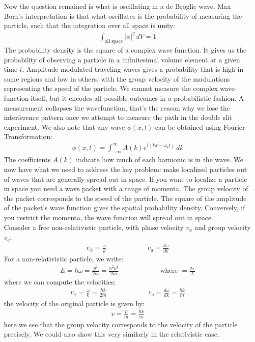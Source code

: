 \documentclass[11pt]{article}
\theoremstyle{break}
\theoremstyle{break}
\begin{document}
Now the question remained is what is oscillating in a de Broglie wave. Max Born's interpretation is that what oscillates is the probability of measuring the particle, such that the integration over all space is unity:
\begin{align*}
\int_{\text{all space}} |\phi|^2 \, dV = 1
\end{align*}
The probability density is the square of a complex wave function. It gives us the probability of observing a particle in a infinitesimal volume element at a given time $t$. Amplitude-modulated traveling waves gives a probability that is high in some regions and low in others, with the group velocity of the modulations representing the speed of the particle. We cannot measure the complex wave-function itself, but it encodes all possible outcomes in a probabilistic fashion. A measurement collapses the wavefunction, that's the reason why we lose the interference pattern once we attempt to measure the path in the double slit experiment. We also note that any wave $\phi(x,t)$ can be obtained using Fourier Transformation:
\begin{align*}
\phi(x,t) = \int_{-\infty}^\infty A(k) e^{i(kx - \omega_k t)}\, dk
\end{align*}
The coefficients $A(k)$ indicate how much of each harmonic is in the wave. We now have what we need to address the key problem: make localized particles out of waves that are generally spread out in space. If you want to localize a particle in space you need a wave packet with a range of momenta. The group velocity of the packet corresponds to the speed of the particle. The square of the amplitude of the packet's wave function gives the spatial probability density. Conversely, if you restrict the momenta, the wave function will spread out in space. \\

Consider a free non-relativistic particle, with phase velocity $v_\phi$ and group velocity $v_g$:
\begin{align*}
v_{\phi}= \frac{\omega}{k} \qquad\qquad\qquad v_g = \frac{d\omega}{dk}
\end{align*}
For a non-relativistic particle, we write:
\begin{align*}
E = \hbar \omega = \frac{p^2}{2m} = \frac{\hbar^2 k^2}{2m} \qquad\qquad\qquad \text{where }=\frac{2\pi}{\lambda}
\end{align*}
where we can compute the velocities:
\begin{align*}
v_{\phi} = \frac{\omega}{k} = \frac{\hbar k}{2m} \qquad\qquad\qquad v_g = \frac{d\omega}{dk} = \frac{\hbar k}{m}
\end{align*}
the velocity of the original particle is given by:
\begin{align*}
v = \frac{p}{m} = \frac{\hbar k}{m}
\end{align*}
here we see that the group velocity corresponds to the velocity of the particle precisely. We could also show this very similarly in the relativistic case. \\
\end{document}
